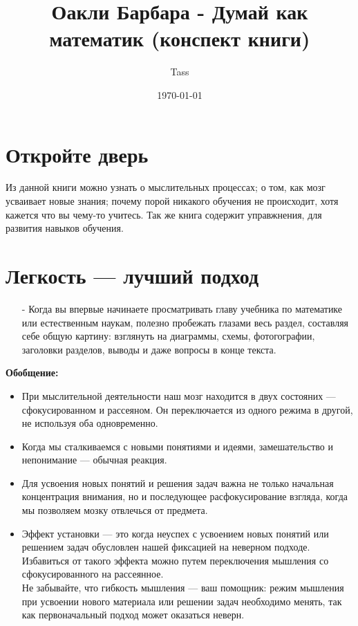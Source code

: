 \documentclass{article}
\begin{document}
\title{Оакли Барбара - Думай как математик (конспект книги)}
\author{Tass}
\date{\today}
\maketitle

\tableofcontents
\newpage

\section{Откройте дверь}
Из данной книги можно узнать о мыслительных процессах; о том, как мозг усваивает новые знания; почему порой никакого обучения не происходит, хотя кажется что вы чему-то учитесь. Так же книга содержит управжнения, для развития навыков обучения.

\section{Легкость --- лучший подход}
\begin{itemize}
\item[-] Когда вы впервые начинаете просматривать главу учебника по математике или естественным наукам, полезно пробежать глазами весь раздел, составляя себе общую картину: взглянуть на диаграммы, схемы, фотогографии, заголовки разделов, выводы и даже вопросы в конце текста.
\end{itemize}
\textbf{Обобщение:}
\begin{itemize}
\item При мыслительной деятельности наш мозг находится в двух состояних --- сфокусированном и рассеяном. Он переключается из одного режима в другой, не используя оба одновременно.
\item Когда мы сталкиваемся с новыми понятиями и идеями, замешательство и непонимание --- обычная реакция.
\item Для усвоения новых понятий и решения задач важна не только начальная концентрация внимания, но и последующее расфокусирование взгляда, когда мы позволяем мозку отвлечься от предмета.
\item Эффект установки --- это когда неуспех с усвоением новых понятий или решением задач обусловлен нашей фиксацией на неверном подходе. Избавиться от такого эффекта можно путем переключения мышления со сфокусированного на рассеянное.\\Не забывайте, что гибкость мышления --- ваш помощник: режим мышления при усвоении нового материала или решении задач необходимо менять, так как первоначальный подход может оказаться неверн.
\end{itemize}
\end{document}
